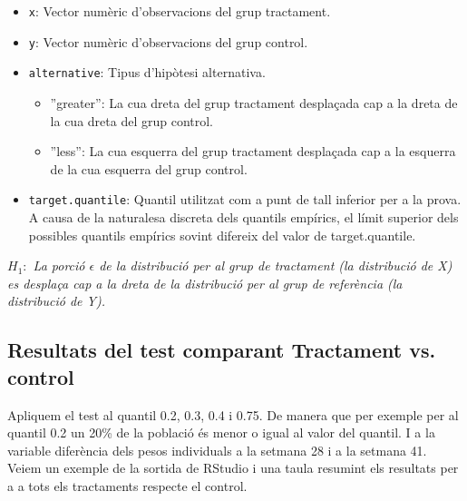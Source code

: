 \documentclass[11pt,a4paper]{article}\usepackage[]{graphicx}\usepackage[]{color}
\begin{document}
\begin{itemize}
  \item \texttt{x}: Vector numèric d'observacions del grup tractament.
  
  \item \texttt{y}: Vector numèric d'observacions del grup control.
  
  \item \texttt{alternative}: Tipus d'hipòtesi alternativa.

\begin{itemize}
      \item ''greater'': La cua dreta del grup tractament desplaçada cap a la dreta de la cua dreta del grup control.
      
      \item ''less'': La cua esquerra del grup tractament desplaçada cap a la esquerra de la cua esquerra del grup control.
\end{itemize}


  \item \texttt{target.quantile}: Quantil utilitzat com a punt de tall inferior per a la prova. A causa de la naturalesa discreta dels quantils empírics, el límit superior dels possibles quantils empírics sovint difereix del valor de target.quantile.

\end{itemize}

\textit{$H_1:$ La porció $\epsilon$ de la distribució per al grup de tractament (la distribució de X) es desplaça cap a la dreta de la distribució per al grup de referència (la distribució de Y).}



\subsection{Resultats del test comparant Tractament vs. control}

Apliquem el test al quantil 0.2, 0.3, 0.4 i 0.75. De manera que per exemple per al quantil 0.2 un 20\% de la població és menor o igual al valor del quantil. I a la variable diferència dels pesos individuals a la setmana 28 i a la setmana 41.\\

Veiem un exemple de la sortida de RStudio i una taula resumint els resultats per a a tots els tractaments respecte el control.





\clearpage
\end{document}
